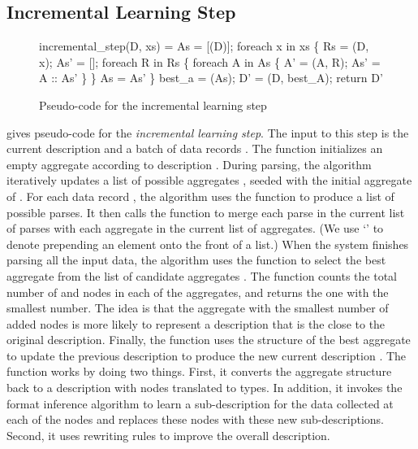 
\subsection{Incremental Learning Step}
\begin{figure}[t]
\begin{codebox}
incremental_step(D, xs) =
  As = [(D)];
  foreach x in xs \{
    Rs = (D, x);
    As' = [];
    foreach R in Rs \{
      foreach A in As \{
        A' = (A, R); 
        As' = A :: As'
      \}
    \}
    As = As'
  \} 
  best_a = (As);
  D' = (D, best_A);  
  return D'
\end{codebox}
\caption{Pseudo-code for the incremental learning step}
\label{fig:inc-learning}
\end{figure}

 gives pseudo-code for the {\em incremental
  learning step}.  The input to this step is the current description
 and a batch of data records .  The 
function initializes an empty aggregate according to description
.  During parsing, the algorithm iteratively updates a list of
possible aggregates , seeded with the initial aggregate of
.  For each data record , the algorithm uses the
 function to produce a list  of possible parses.  It
then calls the  function to merge each parse  in
the current list of parses with each aggregate  in the current
list of aggregates.  (We use `\cd{::}' to denote prepending an element
onto the front of a list.)  When the system finishes parsing all the
input data, the algorithm uses the  function to
select the best aggregate from the list of candidate aggregates
.  The  function counts the total number of
 and  nodes in each of the aggregates, and returns
the one with the smallest number.
The idea is that the aggregate with the smallest number of added nodes is 
more likely to represent a description
that is the close to the original description. 
Finally, the  function uses the structure of the best
aggregate to update the previous description  to produce the new
current description .  The  function works by
doing two things.
First, it converts the aggregate structure back to a \pads{} description
with  nodes translated to  types. In addition,
it invokes the \learnpads{} format inference
algorithm to learn a sub-description for the data collected 
at each of the  nodes
and replaces these  nodes with these new sub-descriptions. 
Second, it uses rewriting
rules to improve the overall description.

